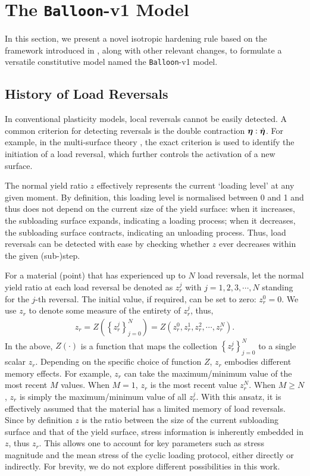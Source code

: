 \section{The \texttt{Balloon}-v1 Model}\label{sec:proposal}
In this section, we present a novel isotropic hardening rule based on the framework introduced in , along with other relevant changes, to formulate a versatile constitutive model named the \texttt{Balloon}-v1 model.
\subsection{History of Load Reversals}
In conventional plasticity models, local reversals cannot be easily detected.
A common criterion for detecting reversals is the double contraction $\bm{\eta}:\dot{\bm{\eta}}$.
For example, in the multi-surface theory \citep{Semenov2022}, the exact criterion is used to identify the initiation of a load reversal, which further controls the activation of a new surface.

The normal yield ratio $z$ effectively represents the current `loading level' at any given moment.
By definition, this loading level is normalised between \num{0} and \num{1} and thus does not depend on the current size of the yield surface: when it increases, the subloading surface expands, indicating a loading process; when it decreases, the subloading surface contracts, indicating an unloading process.
Thus, load reversals can be detected with ease by checking whether $z$ ever decreases within the given (sub-)step.

For a material (point) that has experienced up to $N$ load reversals, let the normal yield ratio at each load reversal be denoted as $z_r^j$ with $j=1,2,3,\cdots,N$ standing for the $j$-th reversal.
The initial value, if required, can be set to zero: $z_r^0=0$.
We use $z_r$ to denote some measure of the entirety of $z_r^j$, thus,
\begin{gather}
    \boxed{z_r=Z\left(\left\{z_r^j\right\}_{j=0}^N\right)=Z\left(z_r^0,z_r^1,z_r^2,\cdots,z_r^N\right).}
\end{gather}
In the above, $Z\left(\cdot\right)$ is a function that maps the collection $\left\{z_r^j\right\}_{j=0}^N$ to a single scalar $z_r$.
Depending on the specific choice of function $Z$, $z_r$ embodies different memory effects.
For example, $z_r$ can take the maximum/minimum value of the most recent $M$ values.
When $M=1$, $z_r$ is the most recent value $z_r^N$.
When $M\geqslant{}N$, $z_r$ is simply the maximum/minimum value of all $z_r^j$.
With this ansatz, it is effectively assumed that the material has a limited memory of load reversals.
Since by definition $z$ is the ratio between the size of the current subloading surface and that of the yield surface, stress information is inherently embedded in $z$, thus $z_r$.
This allows one to account for key parameters such as stress magnitude and the mean stress of the cyclic loading protocol, either directly or indirectly.
For brevity, we do not explore different possibilities in this work.
